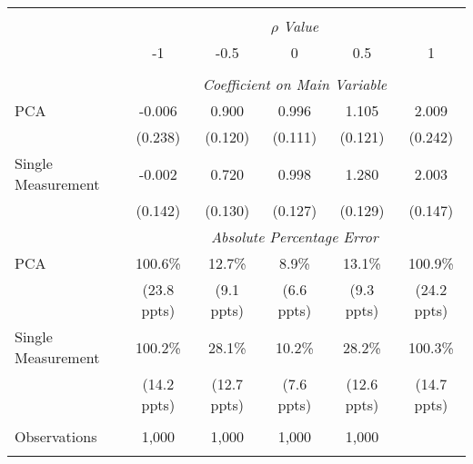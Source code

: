 \begin{table}[!htbp] \centering
\begin{tabular}{@{\extracolsep{5pt}}lccccc}
\\[-1.8ex]\hline
\hline \\[-1.8ex]
& \multicolumn{5}{c}{$\rho$ \textit{ Value}} \
\cr \cline{5-6}
\\[-1.8ex] & -1 & -0.5 & 0 & 0.5 & 1 \\
\hline \\[-1.8ex]
& \multicolumn{5}{c}{\textit{Coefficient on Main Variable}} \\
 PCA & -0.006 & 0.900 & 0.996 & 1.105 & 2.009  \\
  & (0.238) & (0.120) & (0.111) & (0.121) & (0.242)\\
  Single Measurement & -0.002 & 0.720 & 0.998 & 1.280 & 2.003  \\
  & (0.142) & (0.130) & (0.127) & (0.129) & (0.147)\\
& \multicolumn{5}{c}{\textit{Absolute Percentage Error}} \\
  PCA & 100.6\% & 12.7\% & 8.9\% & 13.1\% & 100.9\% \\
   & (23.8 ppts) & (9.1 ppts) & (6.6 ppts) & (9.3 ppts) & (24.2 ppts)\\
  Single Measurement & 100.2\% & 28.1\% & 10.2\% & 28.2\% & 100.3\%  \\
  & (14.2 ppts) & (12.7 ppts) & (7.6 ppts) & (12.6 ppts) & (14.7 ppts)\\
\hline \\[-1.8ex]
 Observations & 1,000 & 1,000 & 1,000 & 1,000 &\\
\hline
\hline \\[-1.8ex]
\end{tabular}
\end{table}
